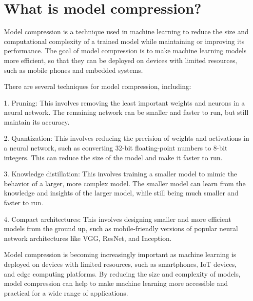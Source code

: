 \section{What is model compression?}
Model compression is a technique used in machine learning to reduce the size and computational complexity of a trained model while maintaining or improving its performance. The goal of model compression is to make machine learning models more efficient, so that they can be deployed on devices with limited resources, such as mobile phones and embedded systems.

There are several techniques for model compression, including:

1. Pruning: This involves removing the least important weights and neurons in a neural network. The remaining network can be smaller and faster to run, but still maintain its accuracy.

2. Quantization: This involves reducing the precision of weights and activations in a neural network, such as converting 32-bit floating-point numbers to 8-bit integers. This can reduce the size of the model and make it faster to run.

3. Knowledge distillation: This involves training a smaller model to mimic the behavior of a larger, more complex model. The smaller model can learn from the knowledge and insights of the larger model, while still being much smaller and faster to run.

4. Compact architectures: This involves designing smaller and more efficient models from the ground up, such as mobile-friendly versions of popular neural network architectures like VGG, ResNet, and Inception.

Model compression is becoming increasingly important as machine learning is deployed on devices with limited resources, such as smartphones, IoT devices, and edge computing platforms. By reducing the size and complexity of models, model compression can help to make machine learning more accessible and practical for a wide range of applications.

